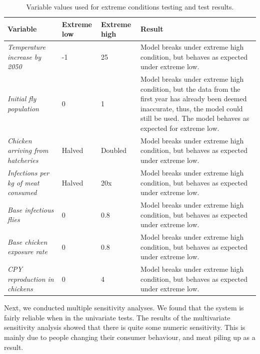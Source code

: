 \begin{longtable}[c]{m{8em} m{3em} m{3em} m{24em}}
\caption{Variable values used for extreme conditions testing and test results.}
\label{tab:extreme_values_results}\\
\hline
Variable & Extreme low & Extreme high & Result \\
\hline
\endfirsthead
%
\endhead

\textit{Temperature increase by 2050}   &   -1          &   25              &   Model breaks under extreme high condition, but behaves as expected under extreme low. \hline \\
\textit{Initial fly population}         &   0           &   1               &   Model breaks under extreme high condition, but the data from the first year has already been deemed inaccurate, thus, the model could still be used. The model behaves as expected for extreme low.   \hline \\
\textit{Chicken arriving from hatcheries} & Halved      &   Doubled         &   Model breaks under extreme high condition, but behaves as expected under extreme low. \hline \\
\textit{Infections per kg of meat consumed} &   Halved  &   20x             &   Model breaks under extreme high condition, but behaves as expected under extreme low. \hline \\
\textit{Base infectious flies}          &   0           &   0.8             &   Model breaks under extreme high condition, but behaves as expected under extreme low. \hline \\
\textit{Base chicken exposure rate}     &   0           &   0.8             &   Model breaks under extreme high condition, but behaves as expected under extreme low. \hline \\
\textit{CPY reproduction in chickens}   &   0           &   4               &   Model breaks under extreme high condition, but behaves as expected under extreme low. \\ \hline
\end{longtable}

Next, we conducted multiple sensitivity analyses. We found that the system is fairly reliable when in the univariate tests. The results of the multivariate sensitivity analysis showed that there is quite some numeric sensitivity. This is mainly due to people changing their consumer behaviour, and meat piling up as a result.

